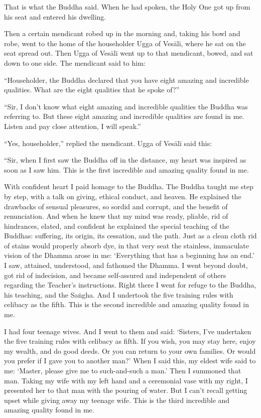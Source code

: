 \documentclass[12pt,openany]{book}%
\begin{document}
That is what the Buddha said. When he had spoken, the Holy One got up from his seat and entered his dwelling. 

Then a certain mendicant robed up in the morning and, taking his bowl and robe, went to the home of the householder Ugga of \textsanskrit{Vesālī}, where he sat on the seat spread out. Then Ugga of \textsanskrit{Vesālī} went up to that mendicant, bowed, and sat down to one side. The mendicant said to him: 

“Householder, the Buddha declared that you have eight amazing and incredible qualities. What are the eight qualities that he spoke of?” 

“Sir, I don’t know what eight amazing and incredible qualities the Buddha was referring to. But these eight amazing and incredible qualities are found in me. Listen and pay close attention, I will speak.” 

“Yes, householder,” replied the mendicant. Ugga of \textsanskrit{Vesālī} said this: 

“Sir, when I first saw the Buddha off in the distance, my heart was inspired as soon as I saw him. This is the first incredible and amazing quality found in me. 

With confident heart I paid homage to the Buddha. The Buddha taught me step by step, with a talk on giving, ethical conduct, and heaven. He explained the drawbacks of sensual pleasures, so sordid and corrupt, and the benefit of renunciation. And when he knew that my mind was ready, pliable, rid of hindrances, elated, and confident he explained the special teaching of the Buddhas: suffering, its origin, its cessation, and the path. Just as a clean cloth rid of stains would properly absorb dye, in that very seat the stainless, immaculate vision of the Dhamma arose in me: ‘Everything that has a beginning has an end.’ I saw, attained, understood, and fathomed the Dhamma. I went beyond doubt, got rid of indecision, and became self-assured and independent of others regarding the Teacher’s instructions. Right there I went for refuge to the Buddha, his teaching, and the \textsanskrit{Saṅgha}. And I undertook the five training rules with celibacy as the fifth. This is the second incredible and amazing quality found in me. 

I had four teenage wives. And I went to them and said: ‘Sisters, I’ve undertaken the five training rules with celibacy as fifth. If you wish, you may stay here, enjoy my wealth, and do good deeds. Or you can return to your own families. Or would you prefer if I gave you to another man?’ When I said this, my eldest wife said to me: ‘Master, please give me to such-and-such a man.’ Then I summoned that man. Taking my wife with my left hand and a ceremonial vase with my right, I presented her to that man with the pouring of water. But I can’t recall getting upset while giving away my teenage wife. This is the third incredible and amazing quality found in me. 
\end{document}
